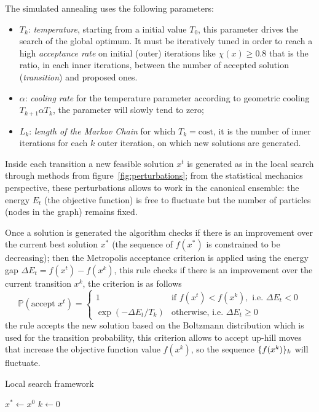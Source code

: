 The simulated annealing uses the following parameters:
\begin{itemize}
	\item $T_k$: \emph{temperature}, starting from a initial value $T_0$, this parameter drives the search of the global optimum. It must be iteratively tuned in order to reach a high \emph{acceptance rate} on initial (outer) iterations like $\chi(x)\geq0.8$ that is the ratio, in each inner iterations, between the number of accepted solution (\emph{transition}) and proposed ones.
	\item $\alpha$: \emph{cooling rate} for the temperature parameter according to geometric cooling $T_{k+1}\alpha T_k$, the parameter will slowly tend to zero;
	\item $L_k$: \emph{length of the Markov Chain} for which $T_k=\text{cost}$, it is the number of inner iterations for each $k$ outer iteration, on which new solutions are generated.
\end{itemize}

Inside each transition a new feasible solution $x^t$ is generated as in the local search through methods from figure~\vref{fig:perturbations}; from the statistical mechanics perspective, these perturbations allows to work in the canonical ensemble: the energy $E_t$ (the objective function) is free to fluctuate but the number of particles (nodes in the graph) remains fixed.

Once a solution is generated the algorithm checks if there is an improvement over the current best solution $x^\ast$ (the sequence of $f(x^\ast)$ is constrained to be decreasing); then the Metropolis acceptance criterion is applied using the energy gap $\Delta E_t=f(x^t)-f(x^k)$, this rule checks if there is an improvement over the current transition $x^k$, the criterion is as follows
\[
\mathbb{P}(\text{accept $x^t$})=
\begin{cases}
	1 & \text{if $f(x^t)<f(x^k), \text{ i.e. } \Delta E_t<0$} \\
	\exp(-\Delta E_t/T_k) & \text{otherwise, i.e. $\Delta E_t\geq0$}
\end{cases}
\]
the rule accepts the new solution based on the Boltzmann distribution which is used for the transition probability, this criterion allows to accept up-hill moves that increase the objective function value $f(x^k)$, so the sequence $\{f(x^k)\}_k$ will fluctuate.


\begin{algorithm}\caption{Local search framework}\label{alg:local-search}
$x^\ast\gets x^0$\;
$k\gets 0$\;
\end{algorithm}



